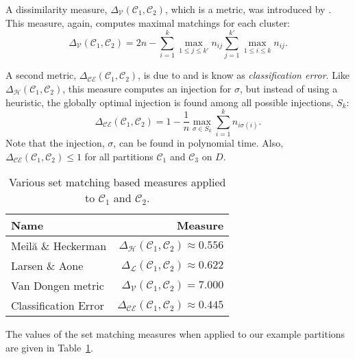 \documentclass[a4paper]{report}
\newcommand{\dset}{D}
\newcommand{\clus}{\mathcal{C}}
\newcommand{\partcompare}[1]{\Delta_{\mathcal{#1}}(\clus_1,\clus_2)}
\begin{document}
A dissimilarity measure, $\partcompare{V}$, which is a metric, was introduced
by \citet{van-dongen-2000}.  This measure, again, computes maximal matchings
for each cluster:
\begin{equation*}
  \partcompare{V} = 2n - \sum_{i=1}^{k} \max_{1 \leq j \leq k'} n_{ij}
                         \sum_{j=1}^{k'} \max_{1 \leq i \leq k} n_{ij}.
\end{equation*}

A second metric, $\partcompare{CE}$, is due to \citet{meila-2005} and is know
as \textit{classification error}.  Like $\partcompare{H}$, this measure
computes an injection for $\sigma$, but instead of using a heuristic, the
globally optimal injection is found among all possible injections, $S_k$:
\begin{equation*}
  \partcompare{CE} = 1 - \frac{1}{n} \max_{\sigma \in S_k}
                                     \sum_{i=1}^{k} n_{i \sigma(i)}.
\end{equation*}
Note that the injection, $\sigma$, can be found in polynomial time.  Also,
$\partcompare{CE} \leq 1$ for all partitions $\clus_1$ and $\clus_3$ on
$\dset$.

\begin{table}
  \centering
  \begin{tabular}{lr}
    \toprule
    Name & Measure \\
    \midrule
    Meilă \& Heckerman   & $\partcompare{H} \approx 0.556$ \\
    Larsen \& Aone       & $\partcompare{L} \approx 0.622$ \\
    Van Dongen metric    & $\partcompare{V} = 7.000$ \\
    Classification Error & $\partcompare{CE} \approx 0.445$ \\
    
    \bottomrule
  \end{tabular}
  \caption{Various set matching based measures applied to $\clus_1$ and $\clus_2$.}
  \label{tab:set-matching-comparison}
\end{table}

The values of the set matching measures when applied to our example partitions
are given in Table~\ref{tab:set-matching-comparison}.
\end{document}
